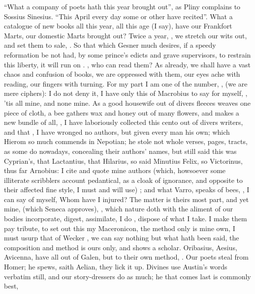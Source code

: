 \enquote{What a company of poets hath this year brought out}, as Pliny complains to
Sossius Sinesius. \enquote{This April every day some or other have
recited}. What a catalogue of new books all this year, all this age (I say),
have our Frankfort Marts, our domestic Marts brought out? Twice a year,
, we stretch our
wits out, and set them to sale, . So that which
Gesner much desires, if a speedy reformation be not had, by
some prince's edicts and grave supervisors, to restrain this liberty, it will
run on . , who can read
them? As already, we shall have a vast chaos and confusion of books, we are
oppressed with them, our eyes ache with
reading, our fingers with turning. For my part I am one of the number, , (we are mere ciphers): I do not deny it, I have only this of
Macrobius to say for myself, , 'tis all mine, and
none mine. As a good housewife out of divers fleeces weaves one piece of cloth,
a bee gathers wax and honey out of many flowers, and makes a new bundle of all,
, I have laboriously
collected this cento out of divers writers, and that
, I have wronged no authors, but given every man his own;
which Hierom so much commends in Nepotian; he stole not
whole verses, pages, tracts, as some do nowadays, concealing their authors'
names, but still said this was Cyprian's, that Lactantius, that Hilarius, so
said Minutius Felix, so Victorinus, thus far Arnobius: I cite and quote mine
authors (which, howsoever some illiterate scribblers account pedantical, as a
cloak of ignorance, and opposite to their affected fine style, I must and will
use) ; and what Varro,  speaks of bees, , I can say of myself, Whom have I injured? The matter is
theirs most part, and yet mine,  (which Seneca
approves), , which nature doth
with the aliment of our bodies incorporate, digest, assimilate, I do
, dispose of what I take. I make them pay tribute, to
set out this my Maceronicon, the method only is mine own, I must usurp that of
Wecker , we can say nothing but what hath been said,
the composition and method is ours only, and shows a scholar. Oribasius,
Aesius, Avicenna, have all out of Galen, but to their own method, . Our poets steal from Homer; he spews, saith Aelian,
they lick it up. Divines use Austin's words verbatim still, and our
story-dressers do as much; he that comes last is commonly best,

